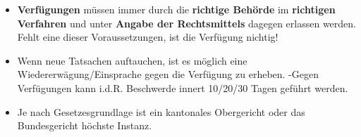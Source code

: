 \begin{itemize}
\tightlist
\item
  \textbf{Verfügungen} müssen immer durch die \textbf{richtige Behörde}
  im \textbf{richtigen Verfahren} und unter \textbf{Angabe der
  Rechtsmittels} dagegen erlassen werden. Fehlt eine dieser
  Voraussetzungen, ist die Verfügung nichtig!
\item
  Wenn neue Tatsachen auftauchen, ist es möglich eine
  Wiedererwägung/Einsprache gegen die Verfügung zu erheben. -Gegen
  Verfügungen kann i.d.R. Beschwerde innert 10/20/30 Tagen geführt
  werden.
\item
  Je nach Gesetzesgrundlage ist ein kantonales Obergericht oder das
  Bundesgericht höchste Instanz.
\end{itemize}
